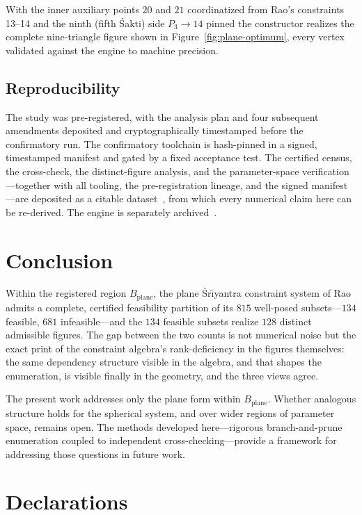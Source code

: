 \documentclass[pdflatex,sn-mathphys-num]{sn-jnl}
\newcommand{\sri}{\'Sr\={\i}yantra}
\newcommand{\Bplane}{B_{\mathrm{plane}}}
\begin{document}
With the inner auxiliary points $20$ and $21$ coordinatized from Rao's constraints 13--14 and the ninth (fifth \'Sakti) side $P_3\!\to\!14$ pinned the constructor realizes the complete nine-triangle figure shown in Figure~\ref{fig:plane-optimum}, every vertex validated against the engine to machine precision.

\subsection*{Reproducibility}
The study was pre-registered, with the analysis plan and four subsequent amendments deposited and cryptographically timestamped before the confirmatory run. The confirmatory toolchain is hash-pinned in a signed, timestamped manifest and gated by a fixed acceptance test. The certified census, the cross-check, the distinct-figure analysis, and the parameter-space verification---together with all tooling, the pre-registration lineage, and the signed manifest---are deposited as a citable dataset~\cite{Dataset}, from which every numerical claim here can be re-derived. The engine is separately archived~\cite{Engine}.

\section{Conclusion}\label{sec6}

Within the registered region $\Bplane$, the plane \sri{} constraint system of Rao~\cite{Rao1998} admits a complete, certified feasibility partition of its $815$ well-posed subsets---$134$ feasible, $681$ infeasible---and the $134$ feasible subsets realize $128$ distinct admissible figures. The gap between the two counts is not numerical noise but the exact print of the constraint algebra's rank-deficiency in the figures themselves: the same dependency structure visible in the algebra, and that shapes the enumeration, is visible finally in the geometry, and the three views agree.

The present work addresses only the plane form within $\Bplane$. Whether analogous structure holds for the spherical system, and over wider regions of parameter space, remains open. The methods developed here---rigorous branch-and-prune enumeration coupled to independent cross-checking---provide a framework for addressing those questions in future work.

\section*{Declarations}
\end{document}

